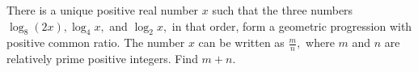 There is a unique positive real number $x$ such that the three numbers $\log_8(2x),\log_4x,$ and $\log_2x,$ in that order, form a geometric progression with positive common ratio. The number $x$ can be written as $\tfrac{m}{n},$ where $m$ and $n$ are relatively prime positive integers. Find $m+n$.